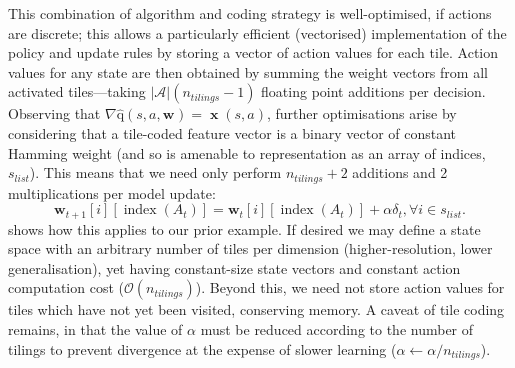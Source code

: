 \documentclass[10pt, times, conference, letterpaper]{IEEEtran}
\newcommand{\acval}[3]{\ensuremath{\operatorname{\hat{q}}(#1, #2, #3)}}
\newcommand{\wvec}[1]{\ensuremath{\bm{w}_{#1}}}
\begin{document}
This combination of algorithm and coding strategy is well-optimised, if actions are discrete; this allows a particularly efficient (vectorised) implementation of the policy and update rules by storing a vector of action values for each tile.
Action values for any state are then obtained by summing the weight vectors from all activated tiles---taking $|\mathcal{A}|(n_{\mathit{tilings}}-1)$ floating point additions per decision.
Observing that $\nabla{\acval{s}{a}{\wvec{}}} = \operatorname{\mathbf{x}}(s, a)$, further optimisations arise by considering that a tile-coded feature vector is a binary vector of constant Hamming weight (and so is amenable to representation as an array of indices, $s_{\mathit{list}}$).
This means that we need only perform $n_{\mathit{tilings}} + 2$ additions and \num{2} multiplications per model update:
\begin{equation}
\bm{w}_{t+1}[i][\operatorname{index}(A_t)] = \bm{w}_{t}[i][\operatorname{index}(A_t)] + \alpha \delta_t, \forall i \in s_{\mathit{list}}.
\label{eqn:sg-sarsa-opt}
\end{equation}
 shows how this applies to our prior example.
If desired we may define a state space with an arbitrary number of tiles per dimension (higher-resolution, lower generalisation), yet having constant-size state vectors and constant action computation cost ($\mathcal{O}(n_{\mathit{tilings}})$).
Beyond this, we need not store action values for tiles which have not yet been visited, conserving memory.
A caveat of tile coding remains, in that the value of $\alpha$ must be reduced according to the number of tilings to prevent divergence at the expense of slower learning ($\alpha \leftarrow \alpha / n_{\mathit{tilings}}$).


\end{document}

